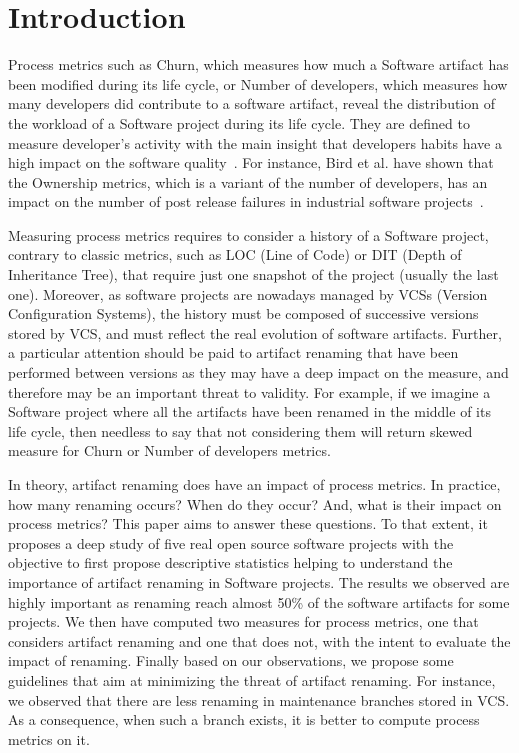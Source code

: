 \section{Introduction}

Process metrics such as Churn, which measures how much a Software artifact has been modified during its life cycle, or Number of developers, which measures how many developers did contribute to a software artifact, reveal the distribution of the workload of a Software project during its life cycle. They are defined to measure developer's activity with the main insight that developers habits have a high impact on the software quality~\cite{rahman_how_2013}. For instance, Bird et al. have shown that the Ownership metrics, which is a variant of the number of developers, has an impact on the number of post release failures in industrial software projects~\cite{bird_dont_2011}.

Measuring process metrics requires to consider a history of a Software project, contrary to classic metrics, such as LOC (Line of Code) or DIT (Depth of Inheritance Tree), that require just one snapshot of the project (usually the last one). Moreover, as software projects are nowadays managed by VCSs (Version Configuration Systems), the history must be composed of successive versions stored by VCS, and must reflect the real evolution of software artifacts. Further, a particular attention should be paid to artifact renaming that have been performed between versions as they may have a deep impact on the measure, and therefore may be an important threat to validity. For example, if we imagine a Software project where all the artifacts have been renamed in the middle of its life cycle, then needless to say that not considering them will return skewed measure for Churn or Number of developers metrics. 

In theory, artifact renaming does have an impact of process metrics. In practice, how many renaming occurs? When do they occur? And, what is their impact on process metrics? This paper aims to answer these questions. To that extent, it proposes a deep study of five real open source software projects with the objective to first propose descriptive statistics helping to understand the importance of artifact renaming in Software projects. The results we observed are highly important as renaming reach almost 50\% of the software artifacts for some projects. We then have computed two measures for process metrics, one that considers artifact renaming and one that does not, with the intent to evaluate the impact of renaming. Finally based on our observations, we propose some guidelines that aim at minimizing the threat of artifact renaming. For instance, we observed that there are less renaming in maintenance branches stored in VCS. As a consequence, when such a branch exists, it is better to compute process metrics on it.

